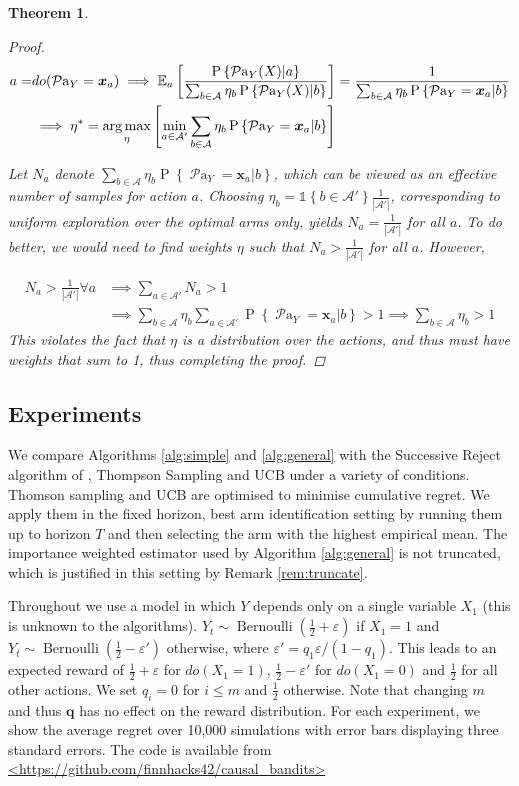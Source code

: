 \documentclass[11pt,a4paper,twoside]{report}
\newcommand{\EE}{\mathbb E}
\newcommand{\EEa}{\EE_a}
\newcommand{\Pn}[2]{\operatorname{P}\left\{#2|#1\right\}}
\newcommand{\calA}{\mathcal A}
\newcommand{\set}[1]{\left\{#1\right\}}
\newcommand{\ind}[1]{\mathds{1}\!\!\set{#1}}
\newcommand{\argmax}{\operatornamewithlimits{arg\,max}}
\newcommand{\eq}[1]{\begin{align*}#1\end{align*}}
\newcommand{\bernoulli}{\operatorname{Bernoulli}}
\newcommand{\parents}[1]{\operatorname{\mathcal{P}a}_{#1}}
\renewcommand{\vec}[1]{\boldsymbol{#1}}
\theoremstyle{plain}
\newtheorem{theorem}{Theorem}
\theoremstyle{definition}
\let\epsilon\varepsilon
\begin{document}
\begin{theorem}
\begin{proof}
\eq{
a =& do(\parents{Y} = \vec{x}_a) \implies \EEa \left[\frac{\Pn{a}{\parents{Y}(X)}}{\sum_{b \in \calA} \eta_b \Pn{b}{\parents{Y}(X)}}\right] = \frac{1}{\sum_{b \in \calA} \eta_b \Pn{b}{\parents{Y}=\vec{x}_a}}\\
& \implies \eta^* = \argmax_\eta \left[\min_{a \in \mathcal{A'}} \sum_{b \in \calA} \eta_b \Pn{b}{\parents{Y}=\vec{x}_a} \right] 
}

Let $N_a$ denote $\sum_{b \in \calA} \eta_b \Pn{b}{\parents{Y}=\vec{x}_a}$, which can be viewed as an effective number of samples for action $a$. Choosing $\eta_b = \ind{b \in \mathcal{A'}}\frac{1}{|\mathcal{A'}|}$, corresponding to uniform exploration over the optimal arms only, yields $N_a = \frac{1}{|\mathcal{A'}|}$ for all $a$. To do better, we would need to find weights $\eta$ such that $N_a > \frac{1}{|\mathcal{A'}|}$ for all $a$. However,

\eq{
N_a > \frac{1}{|\mathcal{A'}|} \forall{a} &\implies \sum_{a\in \mathcal{A'}}N_a > 1\\ 
&\implies \sum_{b \in \calA}\eta_b\sum_{a\in \mathcal{A'}}  \Pn{b}{\parents{Y}=\vec{x}_a} > 1
\implies \sum_{b \in \calA}\eta_b > 1
}
This violates the fact that $\eta$ is a distribution over the actions, and thus must have weights that sum to 1, thus completing the proof.
\end{proof}
\end{theorem} 

\subsection{Experiments}
\label{sec:causal-bandit-experiments}
We compare Algorithms \ref{alg:simple} and \ref{alg:general} with the Successive Reject algorithm of \citet{Audibert2010}, Thompson Sampling and UCB under a variety of conditions. Thomson sampling and UCB are optimised to minimise cumulative regret. We apply them in the fixed horizon, best arm identification setting by running them up to horizon $T$ and then selecting the arm with the highest empirical mean. The importance weighted estimator used by Algorithm \ref{alg:general} is not truncated, which is justified in this setting by Remark \ref{rem:truncate}. 

Throughout we use a model in which $Y$ depends only on a single variable $X_1$ (this is unknown to the algorithms). $Y_t \sim \bernoulli(\frac{1}{2}+\epsilon)$ if $X_1=1$ and $Y_t \sim \bernoulli(\frac{1}{2}-\epsilon')$ otherwise, where $\epsilon' = q_1\epsilon/(1-q_1)$. This leads to an expected reward of $\frac{1}{2}+\epsilon$ for $do(X_1=1)$, $\frac{1}{2}-\epsilon'$ for $do(X_1=0)$ and $\frac{1}{2}$ for all other actions. We set $q_i = 0$ for $i \leq m$ and $\frac{1}{2}$ otherwise. Note that changing $m$ and thus $\boldsymbol{q}$ has no effect on the reward distribution. For each experiment, we show the average regret over 10,000 simulations with error bars displaying three standard errors. The code is available from \url{<https://github.com/finnhacks42/causal_bandits>} 
\end{document}
